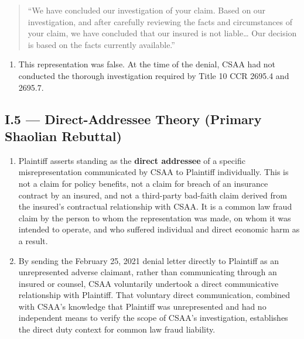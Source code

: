 \begin{quote}
``We have concluded our investigation of your claim. Based on our investigation, and after carefully reviewing the facts and circumstances of your claim, we have concluded that our insured is not liable\ldots{} Our decision is based on the facts currently available.''
\end{quote}

\begin{enumerate}
\def\labelenumi{\arabic{enumi}.}
\setcounter{enumi}{3}
\tightlist
\item
  This representation was false. At the time of the denial, CSAA had not conducted the thorough investigation required by Title 10 CCR \textsection{}\textsection{} 2695.4 and 2695.7.
\end{enumerate}

\subsection{\textsection{}I.5 --- Direct-Addressee Theory (Primary Shaolian Rebuttal)}\label{i.5-direct-addressee-theory-primary-shaolian-rebuttal}

\begin{enumerate}
\def\labelenumi{\arabic{enumi}.}
\setcounter{enumi}{4}
\item
  Plaintiff asserts standing as the \textbf{direct addressee} of a specific misrepresentation communicated by CSAA to Plaintiff individually. This is not a claim for policy benefits, not a claim for breach of an insurance contract by an insured, and not a third-party bad-faith claim derived from the insured's contractual relationship with CSAA. It is a common law fraud claim by the person to whom the representation was made, on whom it was intended to operate, and who suffered individual and direct economic harm as a result.
\item
  By sending the February 25, 2021 denial letter directly to Plaintiff as an unrepresented adverse claimant, rather than communicating through an insured or counsel, CSAA voluntarily undertook a direct communicative relationship with Plaintiff. That voluntary direct communication, combined with CSAA's knowledge that Plaintiff was unrepresented and had no independent means to verify the scope of CSAA's investigation, establishes the direct duty context for common law fraud liability.
\end{enumerate}


